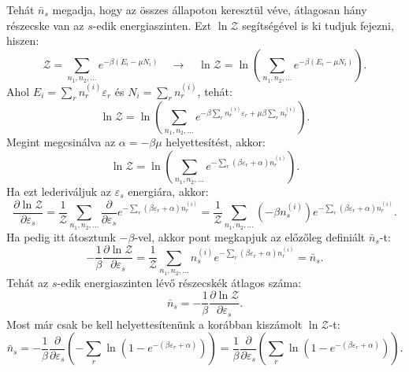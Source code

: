 \documentclass[../main.tex]{subfiles}
\begin{document}
Tehát $\bar{n}_s$ megadja, hogy az összes állapoton keresztül véve, átlagosan hány részecske van az $s$-edik energiaszinten. Ezt $\ln \mathcal{Z}$ segítségével is ki tudjuk fejezni, hiszen:
\begin{equation}
    \mathcal{Z} = \sum_{n_1, n_2, \ldots} e^{-\beta (E_i - \mu N_i)} \quad \rightarrow \quad \ln \mathcal{Z} = \ln \left( \sum_{n_1, n_2, \ldots} e^{-\beta (E_i - \mu N_i)} \right).
\end{equation}
Ahol $E_i = \sum_r n^{(i)}_r \varepsilon_r$ és $N_i = \sum_r n^{(i)}_r$, tehát:
\begin{equation}
    \ln \mathcal{Z} = \ln \left( \sum_{n_1, n_2, \ldots} e^{- \beta \sum_r n^{(i)}_r \varepsilon_r + \mu \beta \sum_r n^{(i)}_r} \right).
\end{equation}
Megint megcsinálva az $\alpha = - \beta \mu$ helyettesítést, akkor:
\begin{equation}
    \ln \mathcal{Z} = \ln \left( \sum_{n_1, n_2, \ldots} e^{- \sum_r (\beta \varepsilon_r + \alpha) n^{(i)}_r} \right).
\end{equation}
Ha ezt lederiváljuk az $\varepsilon_s$ energiára, akkor:
\begin{equation}
    \frac{\partial \ln \mathcal{Z}}{\partial \varepsilon_s} = \frac{1}{\mathcal{Z}} \sum_{n_1, n_2, \ldots} \frac{\partial}{\partial \varepsilon_s} e^{- \sum_r (\beta \varepsilon_r + \alpha) n^{(i)}_r} = \frac{1}{\mathcal{Z}} \sum_{n_1, n_2, \ldots} (-\beta n^{(i)}_s) e^{- \sum_r (\beta \varepsilon_r + \alpha) n^{(i)}_r}. 
\end{equation}
Ha pedig itt átosztunk $- \beta$-vel, akkor pont megkapjuk az előzőleg definiált $\bar{n}_s$-t:
\begin{equation}
    - \frac{1}{\beta} \frac{\partial \ln \mathcal{Z}}{\partial \varepsilon_s} = \frac{1}{\mathcal{Z}} \sum_{n_1, n_2, \ldots} n^{(i)}_s e^{- \sum_r (\beta \varepsilon_r + \alpha) n^{(i)}_r} = \bar{n}_s.
\end{equation}
Tehát az $s$-edik energiaszinten lévő részecskék átlagos száma:
\begin{equation}
    \bar{n}_s = - \frac{1}{\beta} \frac{\partial \ln \mathcal{Z}}{\partial \varepsilon_s}.
\end{equation}
Most már csak be kell helyettesítenünk a korábban kiszámolt $\ln \mathcal{Z}$-t:
\begin{equation}
    \bar{n}_s = - \frac{1}{\beta} \frac{\partial}{\partial \varepsilon_s} \left( - \sum_r \ln (1 - e^{-(\beta \varepsilon_r + \alpha)}) \right) = \frac{1}{\beta} \frac{\partial}{\partial \varepsilon_s} \left( \sum_r \ln (1 - e^{-(\beta \varepsilon_r + \alpha)}) \right).
\end{equation}
\end{document}
